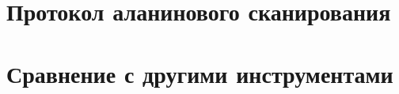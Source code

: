 \section{Протокол аланинового сканирования}


\section{Сравнение с другими инструментами}





\vspace{10cm}



